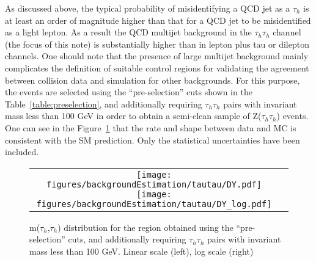 As discussed above, the typical probability of misidentifying a QCD jet as a $\tau_h$ is at least an order of magnitude higher than that for a QCD jet to be misidentified as a light lepton. As a result the QCD multijet background in the $\tau_h\tau_h$ channel (the focus of this note) is substantially higher than in lepton plus tau or dilepton channels. One should note that the presence of large multijet background mainly complicates the definition of suitable control regions for validating the agreement between collision data and simulation for other backgrounds. For this purpose, the events are selected using the ``pre-selection'' cuts shown in the Table~\ref{table:preselection}, and additionally requiring $\tau_h\tau_h$ pairs with invariant mass less than 100 GeV in order to obtain a semi-clean sample of Z($\tau_h \tau_h$) events. One can see in the Figure~\ref{fig:DY} that the rate and shape between data and MC is consistent with the SM prediction. Only the statistical uncertainties have been included.


\begin{figure}[tbhp!]
      \centering
      \begin{tabular}{cc}
        \texttt{[image: figures/backgroundEstimation/tautau/DY.pdf]}
        \texttt{[image: figures/backgroundEstimation/tautau/DY\_log.pdf]}
      \end{tabular}
     \caption{m($\tau_h$,$\tau_h$) distribution for the  region obtained using the ``pre-selection'' cuts, and
       additionally requiring $\tau_h \tau_h$ pairs with invariant mass less than 100 GeV. Linear scale (left), log scale (right)}
    \label{fig:DY}
 \end{figure}




